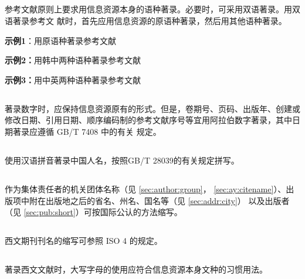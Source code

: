 \documentclass[twoside]{article}%
\begin{document}
{
\renewcommand\addcontentsline[3]{}
\subsection{} 参考文献原则上要求用信息资源本身的语种著录。必要时，可采用双语著录。用双语著录参考文
献时，首先应用信息资源的原语种著录，然后用其他语种著录。

\textbf{示例1}：用原语种著录参考文献

\begin{refsection}
\nocite{周鲁卫2011--}
\nocite{japaneserefc}
\nocite{RUDDOCK2009--}
\nocite{russianrefc}

{\printbibliography[env=indentegenv,heading=none]}
\end{refsection}

\textbf{示例2：}用韩中两种语种著录参考文献
\begin{refsection}
\nocite{李炳穆set}
\nocite{图书馆信息政策set}


{\printbibliography[heading=none,env=indentegenv]}
\end{refsection}

\textbf{示例3：}用中英两种语种著录参考文献
\begin{refsection}
\nocite{熊平set}
\nocite{脱贫攻坚2021set}

{\printbibliography[heading=none,env=indentegenv]}
\end{refsection}


\subsection{} 著录数字时，应保持信息资源原有的形式。但是，卷期号、页码、出版年、创建或修改日期、引用日期、顺序编码制的参考文献序号等宜用阿拉伯数字著录，其中日期著录应遵循 GB/T 7408 中的有关
规定。

\subsection{} 使用汉语拼音著录中国人名，按照GB/T 28039的有关规定拼写。

\subsection{} 作为集体责任者的机关团体名称（见 \ref{sec:author:group}， \ref{sec:ay:citename}）、出版项中附在出版地之后的省名、州名、国名等（见 \ref{sec:addr:city}）
以及出版者（见 \ref{sec:pub:short}）可按国际公认的方法缩写。

\subsection{} 西文期刊刊名的缩写可参照 ISO 4 的规定。

\subsection{} 著录西文文献时，大写字母的使用应符合信息资源本身文种的习惯用法。


}
\end{document}
